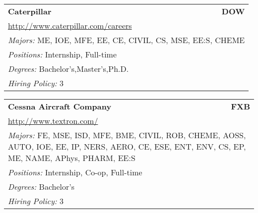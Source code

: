 \documentclass[twoside]{article}
\begin{document}
\begin{center}
\begin{multicols}{3}
\begin{FlushLeft}
\begin{minipage}{\columnwidth}
\end{minipage}
 
\begin{minipage}{\columnwidth}\begin{tabularx}{.95\columnwidth}{Xr}
                 {\Large\bf Caterpillar} & {\Large\bf DOW}\\
    \multicolumn{2}{p{.95\columnwidth}}{\url{http://www.caterpillar.com/careers}}\\
    \multicolumn{2}{p{.95\columnwidth}}{\emph{Majors:} ME, IOE, MFE, EE, CE, CIVIL, CS, MSE, EE:S, CHEME}\\
    \multicolumn{2}{p{.95\columnwidth}}{\emph{Positions:} Internship, Full-time}\\
    \multicolumn{2}{p{.95\columnwidth}}{\emph{Degrees:} Bachelor's,Master's,Ph.D.}\\
    \multicolumn{2}{p{.95\columnwidth}}{\emph{Hiring Policy:} 3}\\
    \end{tabularx}
    
\end{minipage}
 
\begin{minipage}{\columnwidth}\begin{tabularx}{.95\columnwidth}{Xr}
                 {\Large\bf Cessna Aircraft Company} & {\Large\bf FXB}\\
    \multicolumn{2}{p{.95\columnwidth}}{\url{http://www.textron.com/}}\\
    \multicolumn{2}{p{.95\columnwidth}}{\emph{Majors:} FE, MSE, ISD, MFE, BME, CIVIL, ROB, CHEME, AOSS, AUTO, IOE, EE, IP, NERS, AERO, CE, ESE, ENT, ENV, CS, EP, ME, NAME, APhys, PHARM, EE:S}\\
    \multicolumn{2}{p{.95\columnwidth}}{\emph{Positions:} Internship, Co-op, Full-time}\\
    \multicolumn{2}{p{.95\columnwidth}}{\emph{Degrees:} Bachelor's}\\
    \multicolumn{2}{p{.95\columnwidth}}{\emph{Hiring Policy:} 3}\\
    \end{tabularx}
    
\end{minipage}
 

\end{FlushLeft}
\end{multicols}
\end{center}
\end{document}
